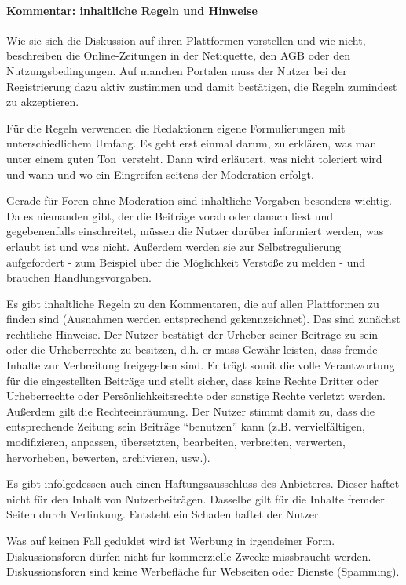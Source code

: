 \paragraph{Kommentar: inhaltliche Regeln und Hinweise}

Wie sie sich die Diskussion auf ihren Plattformen vorstellen und wie nicht,
beschreiben die Online-Zeitungen in der Netiquette, den AGB oder den
Nutzungsbedingungen. Auf manchen Portalen muss der Nutzer bei der Registrierung
dazu aktiv zustimmen und damit bestätigen, die Regeln zumindest zu akzeptieren.

Für die Regeln verwenden die Redaktionen eigene Formulierungen mit
unterschiedlichem Umfang. Es geht erst einmal darum, zu erklären, was man unter
einem \glqq guten Ton\grqq\ versteht. Dann wird erläutert, was nicht toleriert
wird und wann und wo ein Eingreifen seitens der Moderation erfolgt.

Gerade für Foren ohne Moderation sind inhaltliche Vorgaben besonders wichtig. Da
es niemanden gibt, der die Beiträge vorab oder danach liest und gegebenenfalls
einschreitet, müssen die Nutzer darüber informiert werden, was erlaubt ist und
was nicht. Außerdem werden sie zur Selbstregulierung aufgefordert - zum Beispiel
über die Möglichkeit Verstöße zu melden - und brauchen Handlungsvorgaben.

Es gibt inhaltliche Regeln zu den Kommentaren, die auf allen Plattformen zu
finden sind (Ausnahmen werden entsprechend gekennzeichnet).  Das sind zunächst
rechtliche Hinweise. Der Nutzer bestätigt der Urheber seiner Beiträge zu sein
oder die Urheberrechte zu besitzen, d.h. er muss Gewähr leisten, dass fremde
Inhalte zur Verbreitung freigegeben sind. Er trägt somit die volle Verantwortung
für die eingestellten Beiträge und stellt sicher, dass keine Rechte Dritter oder
Urheberrechte oder Persönlichkeitsrechte oder sonstige Rechte verletzt werden.
Außerdem gilt die Rechteeinräumung. Der Nutzer stimmt damit zu, dass die
entsprechende Zeitung sein Beiträge ``benutzen'' kann (z.B. vervielfältigen,
modifizieren, anpassen, übersetzten, bearbeiten, verbreiten, verwerten,
hervorheben, bewerten, archivieren, usw.).

Es gibt infolgedessen auch einen Haftungsausschluss des Anbieteres. Dieser
haftet nicht für den Inhalt von Nutzerbeiträgen. Dasselbe gilt für die Inhalte
fremder Seiten durch Verlinkung. Entsteht ein Schaden haftet der Nutzer.

Was auf keinen Fall geduldet wird ist Werbung in irgendeiner Form.
Diskussionsforen dürfen nicht für kommerzielle Zwecke missbraucht werden.
Diskussionsforen sind keine Werbefläche für Webseiten oder Dienste (Spamming).

